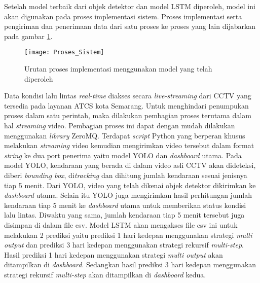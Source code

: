 \documentclass[../thesis.tex]{subfiles}
\begin{document}
Setelah model terbaik dari objek detektor dan model LSTM diperoleh, model ini akan digunakan pada proses implementasi sistem. Proses implementasi serta pengiriman dan penerimaan data dari satu proses ke proses yang lain dijabarkan pada gambar \ref{implementasi_sistem}.
\begin{figure}[htp]
	\centering
	\texttt{[image: Proses\_Sistem]}
	\caption{Urutan proses implementasi menggunakan model yang telah diperoleh}
	\label{implementasi_sistem}
\end{figure}
Data kondisi lalu lintas \textit{real-time} diakses secara \textit{live-streaming} dari CCTV yang tersedia pada layanan ATCS kota Semarang. Untuk menghindari penumpukan proses dalam satu perintah, maka dilakukan pembagian proses terutama dalam hal \textit{streaming} video.
Pembagian proses ini dapat dengan mudah dilakukan menggunakan \textit{library} ZeroMQ. 
Terdapat \textit{script} Python yang berperan khusus melakukan \textit{streaming} video kemudian mengirimkan video tersebut dalam format \textit{string} ke dua port penerima yaitu model YOLO dan \textit{dashboard} utama. Pada model YOLO, kendaraan yang berada di dalam video asli CCTV akan dideteksi, diberi \textit{bounding box}, di\textit{tracking} dan dihitung jumlah kendaraan sesuai jenisnya tiap 5 menit.
Dari YOLO, video yang telah dikenai objek detektor dikirimkan ke \textit{dashboard} utama. Selain itu YOLO juga mengirimkan hasil perhitungan jumlah kendaraan tiap 5 menit ke \textit{dashboard} utama untuk memberikan status kondisi lalu lintas. Diwaktu yang sama, jumlah kendaraan tiap 5 menit tersebut juga disimpan di dalam file csv. 
Model LSTM akan mengakses file csv ini untuk melakukan 2 prediksi yaitu prediksi 1 hari kedepan menggunakan strategi \textit{multi output} dan prediksi 3 hari kedepan menggunakan strategi rekursif \textit{multi-step}. Hasil prediksi 1 hari kedepan menggunakan strategi \textit{multi output} akan ditampilkan di \textit{dashboard}. Sedangkan hasil prediksi 3 hari kedepan menggunakan strategi rekursif \textit{multi-step}
akan ditampilkan di \textit{dashboard} kedua.
\end{document}
